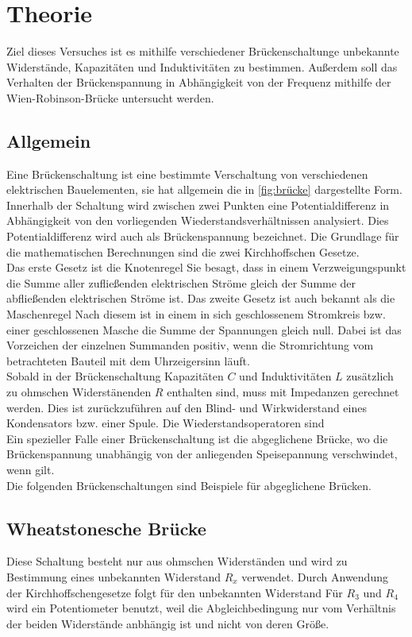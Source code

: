 \section{Theorie}
\label{sec:Theorie}
Ziel dieses Versuches ist es mithilfe verschiedener Brückenschaltunge unbekannte Widerstände, Kapazitäten und Induktivitäten zu bestimmen.
Außerdem soll das Verhalten der Brückenspannung in Abhängigkeit von der Frequenz mithilfe der Wien-Robinson-Brücke untersucht werden.

\subsection{Allgemein}
\label{subsec:allgemein}
Eine Brückenschaltung ist eine bestimmte Verschaltung von verschiedenen elektrischen Bauelementen, sie hat allgemein die in \autoref{fig:brücke} dargestellte Form.\\
Innerhalb der Schaltung wird zwischen zwei Punkten eine Potentialdifferenz in Abhängigkeit von den vorliegenden Wiederstandsverhältnissen analysiert.
Dies Potentialdifferenz wird auch als Brückenspannung bezeichnet.
Die Grundlage für die mathematischen Berechnungen sind die zwei Kirchhoffschen Gesetze.\\
Das erste Gesetz ist die Knotenregel
Sie besagt, dass in einem Verzweigungspunkt die Summe aller zufließenden elektrischen Ströme gleich der Summe der abfließenden elektrischen Ströme ist. 
Das zweite Gesetz ist auch bekannt als die Maschenregel
Nach diesem ist in einem in sich geschlossenem Stromkreis bzw. einer geschlossenen Masche die Summe der Spannungen gleich null. 
Dabei ist das Vorzeichen der einzelnen Summanden positiv, wenn die Stromrichtung vom betrachteten Bauteil mit dem Uhrzeigersinn läuft.\\
Sobald in der Brückenschaltung Kapazitäten $C$ und Induktivitäten $L$ zusätzlich zu ohmschen Widerstänenden $R$ enthalten sind, muss mit Impedanzen gerechnet werden.
Dies ist zurückzuführen auf den Blind- und Wirkwiderstand eines Kondensators bzw. einer Spule.
Die Wiederstandsoperatoren sind 
\\
Ein spezieller Falle einer Brückenschaltung ist die abgeglichene Brücke, wo die Brückenspannung unabhängig von der anliegenden Speisepannung verschwindet, wenn 
gilt.\\
Die folgenden Brückenschaltungen sind Beispiele für abgeglichene Brücken.

\subsection{Wheatstonesche Brücke}
\label{subsec:wheatstone}
Diese Schaltung besteht nur aus ohmschen Widerständen und wird zu Bestimmung eines unbekannten Widerstand $R_x$ verwendet.
Durch Anwendung der Kirchhoffschengesetze folgt für den unbekannten Widerstand
Für $R_3$ und $R_4$ wird ein Potentiometer benutzt, weil die Abgleichbedingung nur vom Verhältnis der beiden Widerstände anbhängig ist und nicht von deren Größe.

